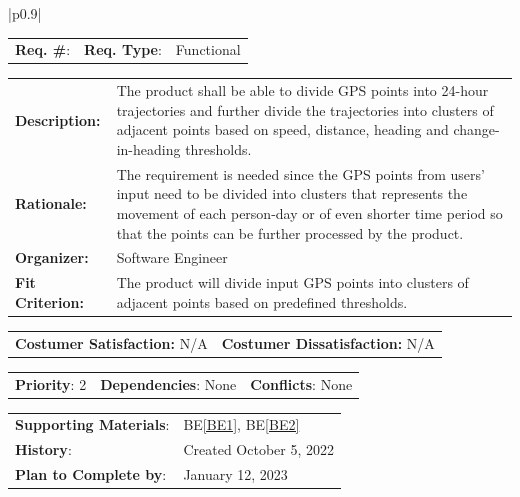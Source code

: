 \documentclass[12pt, titlepage]{article}
\newcommand{\beref}[1]{BE\ref{#1}}
\newcounter{reqnum}
\newcommand{\reqthereqnum}{\textbf{Req. \#}: \thereqnum}
\newenvironment{boxed}
    {\begin{center}
    \begin{tabular}{|p{0.9\textwidth}|}
    \hline\\
    }
    { 
    \\\\\hline
    \end{tabular} 
    \end{center}
    }
\begin{document}
\begin{boxed}
\begin{tabular}{l r r}
{reqnum} \reqthereqnum \label{Req3} & {\bf Req. Type}: &  Functional\\
\end{tabular}
\newline
\begin{tabular}{l p{11.5cm}}
    {\bf Description:} & The product shall be able to divide GPS points into 24-hour trajectories and further divide the trajectories into clusters of adjacent points based on speed, distance, heading and change-in-heading thresholds.  \\
    {\bf Rationale:} & The requirement is needed since the GPS points from users' input need to be divided into clusters that represents the movement of each person-day or of even shorter time period so that the points can be further processed by the product.\\
    {\bf Organizer:} & Software Engineer\\
    {\bf Fit Criterion:} & The product will divide input GPS points into clusters of adjacent points based on predefined thresholds.\\
\end{tabular}
\begin{tabular}{l r}
{\bf Costumer Satisfaction:} N/A &  {\bf Costumer Dissatisfaction:}  N/A\\
\end{tabular}
\begin{tabular}{l r r}
    {\bf Priority}: 2 & {\bf Dependencies}: None  & {\bf Conflicts}: None \\
\end{tabular}
\begin{tabular}{l l}
     {\bf Supporting Materials}:& 
     \beref{BE1}, \beref{BE2} \\ 
     {\bf History}: & Created October 5, 2022\\
     {\bf Plan to Complete by}: & January 12, 2023\\
\end{tabular}
\end{boxed}
\end{document}
